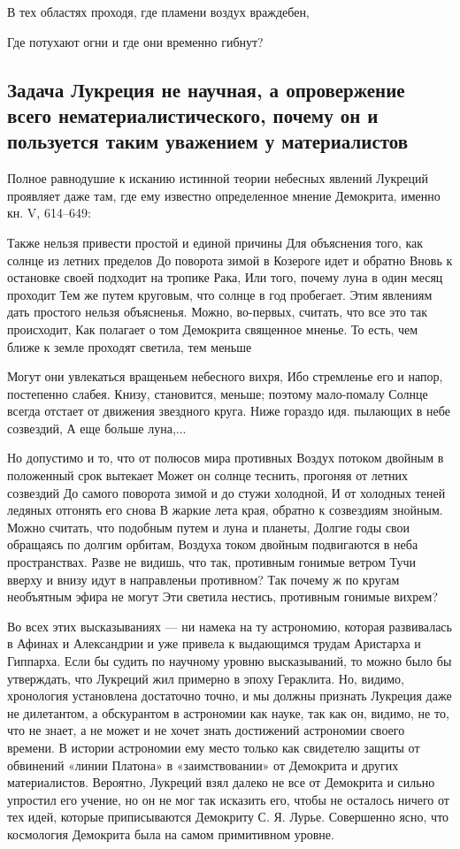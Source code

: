 В тех областях проходя, где пламени воздух враждебен,

Где потухают огни и где они временно гибнут?

\subsection{Задача   Лукреция  не   научная,   а  опровержение   всего
нематериалистического,  почему  он  и  пользуется  таким  уважением  у
материалистов}

Полное равнодушие к исканию  истинной теории небесных явлений Лукреций
проявляет даже  там, где  ему известно определенное  мнение Демокрита,
именно кн. V, 614--649:

Также нельзя  привести простой и  единой причины Для  объяснения того,
как солнце  из летних  пределов До  поворота зимой  в Козероге  идет и
обратно Вновь  к остановке своей  подходит на тропике Рака,  Или того,
почему луна в один месяц проходит  Тем же путем круговым, что солнце в
год пробегает.  Этим явлениям дать простого  нельзя объясненья. Можно,
во-первых, считать,  что все  это так происходит,  Как полагает  о том
Демокрита  священное  мненье. То  есть,  чем  ближе к  земле  проходят
светила, тем меньше

Могут  они увлекаться  вращеньем небесного  вихря, Ибо  стремленье его
и  напор,  постепенно  слабея.   Книзу,  становится,  меньше;  поэтому
мало-помалу Солнце  всегда отстает  от движения звездного  круга. Ниже
гораздо идя. пылающих в небе созвездий, А еще больше луна,...

Но  допустимо и  то,  что  от полюсов  мира  противных Воздух  потоком
двойным в положенный  срок вытекает Может он  солнце теснить, прогоняя
от летних созвездий До самого поворота зимой и до стужи холодной, И от
холодных теней ледяных отгонять его  снова В жаркие лета края, обратно
к  созвездиям знойным.  Можно считать,  что  подобным путем  и луна  и
планеты, Долгие годы  свои обращаясь по долгим  орбитам, Воздуха током
двойным подвигаются  в неба пространствах.  Разве не видишь,  что так,
противным  гонимые  ветром Тучи  вверху  и  внизу идут  в  направленьи
противном?  Так почему  ж  по  кругам необъятным  эфира  не могут  Эти
светила нестись, противным гонимые вихрем?

Во всех  этих высказываниях  --- ни намека  на ту  астрономию, которая
развивалась в Афинах  и Александрии и уже привела  к выдающимся трудам
Аристарха и Гиппарха. Если бы  судить по научному уровню высказываний,
то  можно  было бы  утверждать,  что  Лукреций  жил примерно  в  эпоху
Гераклита.  Но, видимо,  хронология  установлена  достаточно точно,  и
мы  должны  признать Лукреция  даже  не  дилетантом, а  обскурантом  в
астрономии как науке,  так как он, видимо,  не то, что не  знает, а не
может и не хочет знать достижений астрономии своего времени. В истории
астрономии ему место  только как свидетелю защиты  от обвинений «линии
Платона»  в  «заимствовании»  от  Демокрита  и  других  материалистов.
Вероятно, Лукреций взял  далеко не все от Демокрита  и сильно упростил
его учение, но он не мог так исказить его, чтобы не осталось ничего от
тех  идей, которые  приписываются  Демокриту С.  Я. Лурье.  Совершенно
ясно, что космология Демокрита была на самом примитивном уровне.

